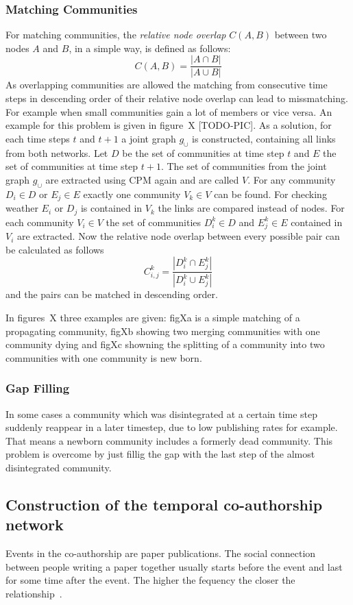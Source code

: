 \documentclass[runningheads,a4paper]{llncs}
\begin{document}
\subsubsection{Matching Communities}
\label{evolution-algo-matching}
For matching communities, the \emph{relative node overlap} $C(A,B)$ between two nodes $A$ and $B$, in a simple way, is defined as follows:
$$C(A,B) = \frac{ \left| A \cap B\right| }{\left| A \cup B\right|}$$
As overlapping communities are allowed the matching from consecutive time steps in descending order of their relative node overlap can lead to missmatching.
For example when small communities gain a lot of members or vice versa. An example for this problem is given in figure~X [TODO-PIC].
As a solution, for each time steps $t$ and $t+1$ a joint graph $g_{\cup}$ is constructed, containing all links from both networks.
Let $D$ be the set of communities at time step $t$ and $E$ the set of communities at time step $t+1$. The set of communities from the joint graph $g_{\cup}$ are extracted using CPM again and are called $V$.
For any community $D_i \in D$ or $E_j \in E$ exactly one community $V_k \in V$ can be found.
For checking weather $E_i$ or $D_j$ is contained in $V_k$ the links are compared instead of nodes.
For each community $V_i \in V$ the set of communities $D_i^k \in D$ and $E_j^k \in E$ contained in $V_i$ are extracted.
Now the relative node overlap between every possible pair can be calculated as follows
$$C^k_{i,j} = \frac{\left| D_i^k \cap E_j^k\right|}{\left| D_i^k\cup E_j^k \right| }$$
and the pairs can be matched in descending order.

In figures~X three examples are given: figXa is a simple matching of a propagating community, figXb showing two merging communities with one community dying and figXc showning the splitting of a community into two communities with one community is new born.

\subsubsection{Gap Filling}
In some cases a community which was disintegrated at a certain time step suddenly reappear in a later timestep, due to low publishing rates for example.
That means a newborn community includes a formerly dead community.
This problem is overcome by just fillig the gap with the last step of the almost disintegrated community.

\subsection{Construction of the temporal co-authorship network}
\label{evolution-constr}
Events in the co-authorship are paper publications.
The social connection between people writing a paper together usually starts before the event and last for some time after the event. The higher the fequency the closer the relationship~\cite{ramasco2006social}.
\end{document}
